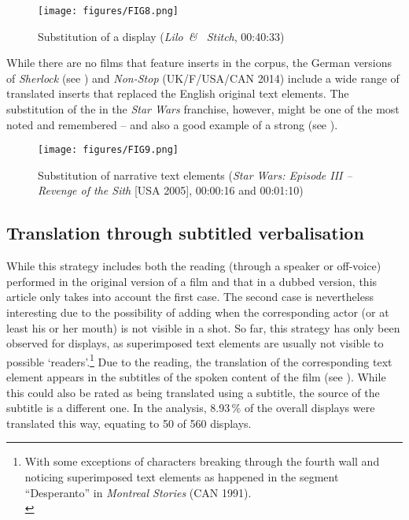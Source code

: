 \begin{figure}
\texttt{[image: figures/FIG8.png]}
\caption{Substitution of a display (\textit{Lilo~\& ~Stitch}, 00:40:33)}
\label{fig:FIG8}
\end{figure}

\largerpage
While there are no films that feature inserts in the corpus, the German versions of \textit{Sherlock} (see ) and \textit{Non-Stop} (UK/F/USA/CAN 2014) include a wide range of translated inserts that replaced the English original text elements. The substitution of the  in the \textit{Star Wars} franchise, however, might be one of the most noted and remembered – and also a good example of a strong  (see ).

\begin{figure}[t]
\texttt{[image: figures/FIG9.png]}
\caption{Substitution of narrative text elements (\textit{Star Wars: Episode III – Revenge of the Sith} [USA 2005], 00:00:16 and 00:01:10)}
\label{fig:FIG9}
\end{figure}

\subsection{Translation through subtitled verbalisation}\label{sec:2.5.4}

While this strategy includes both the reading (through a speaker or off-voice) performed in the original version of a film and that in a dubbed version, this article only takes into account the first case. The second case is nevertheless interesting due to the possibility of adding  when the corresponding actor (or at least his or her mouth) is not visible in a shot. So far, this strategy has only been observed for displays, as superimposed text elements are usually not visible to possible ‘readers’.\footnote{With some exceptions of characters breaking through the fourth wall and noticing superimposed text elements as happened in the segment “Desperanto” in \textit{Montreal Stories} (CAN 1991).\\
} Due to the reading, the translation of the corresponding text element appears in the subtitles of the spoken content of the film (see ). While this could also be rated as being translated using a subtitle, the source of the subtitle is a different one. In the analysis, 8.93\,\% of the overall displays were translated this way, equating to 50 of 560 displays.

